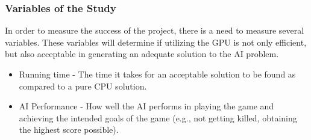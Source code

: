 \subsubsection*{Variables of the Study}
In order to measure the success of the project, there is a need to measure several variables. These
variables will determine if utilizing the GPU is not only efficient, but also acceptable in generating
an adequate solution to the AI problem.

\begin{itemize}
 \item Running time - The time it takes for an acceptable solution to be found as compared to
a pure CPU solution.

 \item AI Performance - How well the AI performs in playing the game and achieving the intended goals
of the game (e.g., not getting killed, obtaining the highest score possible).
\end{itemize}